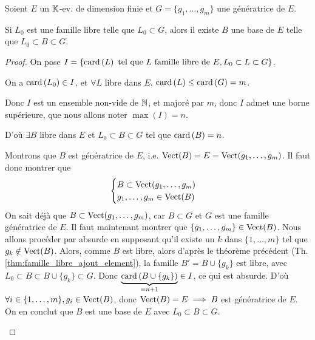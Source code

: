 \documentclass[12pt, a4paper]{report}
\begin{document}
\begin{property}
    Soient $E$ un $\mathbb{K}$-ev. de dimension finie et $G = \{g_1,\dots,g_m\}$ une génératrice de $E$.

    Si $L_0$ est une famille libre telle que $L_0 \subset G$, alors il existe $B$ une base de $E$ telle que $L_0 \subset B \subset G$.
    \label{prop:base_incomplete_famille_libre_subset_generatrice}
\end{property}

\begin{proof}
    On pose $I = \{\mathrm{card}\left(L\right) \text{ tel que } L \text{ famille libre de } E, L_0 \subset L \subset G\}$.

    \begin{outline}
        \1 On a $\mathrm{card}\left(L_0\right) \in I$, et $\forall L$ libre dans $E$, $\mathrm{card}\left(L\right) \le \mathrm{card}\left(G\right) = m$.

        \1 Donc $I$ est un ensemble non-vide de $\mathbb{N}$, et majoré par $m$, donc $I$ admet une borne supérieure, que nous allons noter $\max(I) = n$.

        \1 D'où $\exists B$ libre dans $E$ et $L_0 \subset B \subset G$ tel que $\mathrm{card}\left(B\right) = n$.

        \1 Montrons que $B$ est génératrice de $E$, i.e. $\mathrm{Vect}(B) = E = \mathrm{Vect}(g_1,\dots,g_m)$.
            \2 Il faut donc montrer que
            $$\begin{cases}
            B \subset \mathrm{Vect}(g_1,\dots,g_m)\\
            g_1,\dots,g_m \in \mathrm{Vect}(B)
            \end{cases}$$
            \2 On sait déjà que $B \subset \mathrm{Vect}(g_1,\dots,g_m)$, car $B \subset G$ et $G$ est une famille génératrice de $E$.
            \2 Il faut maintenant montrer que $\{g_1,\dots,g_m\} \in \mathrm{Vect}(B)$.
            \3 Nous allons procéder par absurde en supposant qu'il existe un $k$ dans $\{1,\dots,m\}$ tel que $g_k \notin \mathrm{Vect}(B)$.
            \3 Alors, comme $B$ est libre, alors d'après le théorème précédent (Th. \ref{thm:famille_libre_ajout_element}), la famille $B' = B\cup \{g_k\}$ est libre, avec $L_0 \subset B \subset B\cup\{g_k\} \subset G$.
            \3 Donc $\underbrace{\mathrm{card}\left(B\cup\{g_k\}\right)}_{=n+1} \in I$, ce qui est absurde.
        \2 D'où $\forall i \in \{1,\dots,m\}, g_i \in \mathrm{Vect}(B)$, donc $\mathrm{Vect}(B) = E \implies B$ est génératrice de $E$.
        \2 On en conclut que $B$ est une base de $E$ avec $L_0 \subset B \subset G$.
    \end{outline}
\end{proof}
\end{document}
